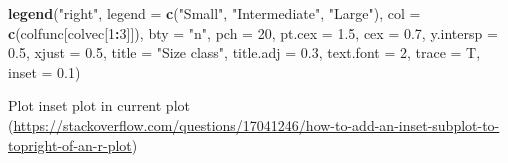 \documentclass[10,portrait]{article}
\newenvironment{Shaded}{\begin{snugshade}}{\end{snugshade}}
\newcommand{\KeywordTok}[1]{\textcolor[rgb]{0.13,0.29,0.53}{\textbf{#1}}}
\newcommand{\DataTypeTok}[1]{\textcolor[rgb]{0.13,0.29,0.53}{#1}}
\newcommand{\DecValTok}[1]{\textcolor[rgb]{0.00,0.00,0.81}{#1}}
\newcommand{\FloatTok}[1]{\textcolor[rgb]{0.00,0.00,0.81}{#1}}
\newcommand{\StringTok}[1]{\textcolor[rgb]{0.31,0.60,0.02}{#1}}
\newcommand{\OperatorTok}[1]{\textcolor[rgb]{0.81,0.36,0.00}{\textbf{#1}}}
\newcommand{\NormalTok}[1]{#1}
\begin{document}
\begin{Shaded}
\begin{Highlighting}[]
\KeywordTok{legend}\NormalTok{(}\StringTok{"right"}\NormalTok{, }\DataTypeTok{legend =} \KeywordTok{c}\NormalTok{(}\StringTok{"Small"}\NormalTok{, }\StringTok{"Intermediate"}\NormalTok{, }
    \StringTok{"Large"}\NormalTok{), }\DataTypeTok{col =} \KeywordTok{c}\NormalTok{(colfunc[colvec[}\DecValTok{1}\OperatorTok{:}\DecValTok{3}\NormalTok{]]), }\DataTypeTok{bty =} \StringTok{"n"}\NormalTok{, }
    \DataTypeTok{pch =} \DecValTok{20}\NormalTok{, }\DataTypeTok{pt.cex =} \FloatTok{1.5}\NormalTok{, }\DataTypeTok{cex =} \FloatTok{0.7}\NormalTok{, }\DataTypeTok{y.intersp =} \FloatTok{0.5}\NormalTok{, }
    \DataTypeTok{xjust =} \FloatTok{0.5}\NormalTok{, }\DataTypeTok{title =} \StringTok{"Size class"}\NormalTok{, }\DataTypeTok{title.adj =} \FloatTok{0.3}\NormalTok{, }
    \DataTypeTok{text.font =} \DecValTok{2}\NormalTok{, }\DataTypeTok{trace =}\NormalTok{ T, }\DataTypeTok{inset =} \FloatTok{0.1}\NormalTok{)}
\end{Highlighting}
\end{Shaded}

Plot inset plot in current plot
(\url{https://stackoverflow.com/questions/17041246/how-to-add-an-inset-subplot-to-topright-of-an-r-plot})
\end{document}
